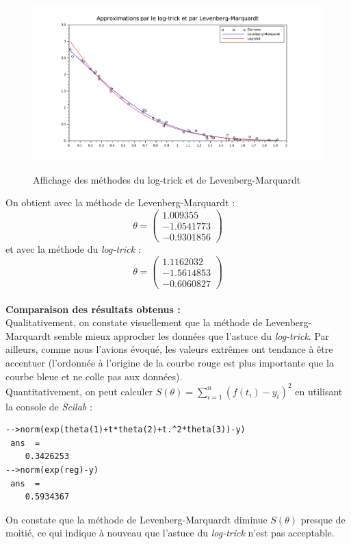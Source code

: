 \documentclass[a4paper,10pt]{report}
\begin{document}
\begin{figure}[H]
\centering
\caption{Affichage des méthodes du log-trick et de Levenberg-Marquardt}
\includegraphics[width=\textwidth]{PMC_non_lineaire.pdf}
\label{graph log_tric et levenberg}
\end{figure}

On obtient avec la méthode de Levenberg-Marquardt :
\abovedisplayskip=0mm
\begin{displaymath}
\theta= \left( \begin{array}{c} 1.009355 \\ - 1.0541773 \\ - 0.9301856 \end{array} \right)
\end{displaymath}
et avec la méthode du \textit{log-trick} :
\abovedisplayskip=0mm
\begin{displaymath}
\theta= \left( \begin{array}{c} 1.1162032 \\ - 1.5614853 \\ - 0.6060827 \end{array} \right)
\end{displaymath} \\
\textbf{Comparaison des résultats obtenus :}\\
Qualitativement, on constate visuellement que la méthode de Levenberg-Marquardt semble mieux approcher les données que l'astuce du \textit{log-trick}. Par ailleurs, comme nous l'avions évoqué, les valeurs extrêmes ont tendance à être accentuer (l'ordonnée à l'origine de  la courbe rouge est plus importante que la courbe bleue et ne colle pas aux données).\\
Quantitativement, on peut calculer $S(\theta)=\sum \limits_{i=1}^n (f(t_i)-y_i)^2$ en utilisant la console de \textit{Scilab} :
\begin{verbatim}
-->norm(exp(theta(1)+t*theta(2)+t.^2*theta(3))-y)
 ans  =
    0.3426253 
-->norm(exp(reg)-y)
 ans  =
    0.5934367  
\end{verbatim}
On constate que la méthode de Levenberg-Marquardt diminue $S(\theta)$ presque de moitié, ce qui indique à nouveau que l'astuce du \textit{log-trick} n'est pas acceptable.
\end{document}
